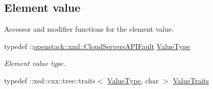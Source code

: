 \subsection*{Element value}
\label{_amgrp2ee2eae1a8c390ea033f241c027da8d6}
Accessor and modifier functions for the element value. \begin{DoxyCompactItemize}
\item 
\hypertarget{classopenstack_1_1xml_1_1CloudServersFault_a255717955e7d4eac467c43fd0ca1ea1d}{
typedef ::\hyperlink{classopenstack_1_1xml_1_1CloudServersAPIFault}{openstack::xml::CloudServersAPIFault} \hyperlink{classopenstack_1_1xml_1_1CloudServersFault_a255717955e7d4eac467c43fd0ca1ea1d}{ValueType}}
\label{classopenstack_1_1xml_1_1CloudServersFault_a255717955e7d4eac467c43fd0ca1ea1d}

\begin{DoxyCompactList}\small\item\em Element value type. \item\end{DoxyCompactList}\item 
\hypertarget{classopenstack_1_1xml_1_1CloudServersFault_aea00ab34b83bb4c1cf381a4bb4579745}{
typedef ::xsd::cxx::tree::traits$<$ \hyperlink{classopenstack_1_1xml_1_1CloudServersAPIFault}{ValueType}, char $>$ \hyperlink{classopenstack_1_1xml_1_1CloudServersFault_aea00ab34b83bb4c1cf381a4bb4579745}{ValueTraits}}
\label{classopenstack_1_1xml_1_1CloudServersFault_aea00ab34b83bb4c1cf381a4bb4579745}


\end{DoxyCompactItemize}
